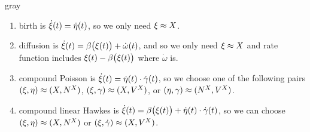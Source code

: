 \begin{color}{gray}
\begin{enumerate}
      \begin{enumerate}
        \item
          birth is  $\dot{\xi}(t) = \dot\eta(t)$, so we only need $\xi \approx X$.
        \item
          diffusion is $\dot{\xi}(t) = \beta\big(\xi(t)\big) + \dot\omega(t)$, and so we only need $\xi\approx X$ and rate function includes $\xi(t) - \beta\big(\xi(t)\big)$ where $\dot\omega$ is.
        \item
          compound Poisson is $\dot{\xi}(t) = \dot\eta(t) \cdot \dot\gamma(t)$, so we choose one of the following pairs $(\xi, \eta) \approx (X, N^X)$, $(\xi, \gamma) \approx (X, V^X)$, or $(\eta, \gamma) \approx (N^X, V^X)$.
        \item
          compound linear Hawkes is $\dot{\xi}(t) = \beta\big(\xi(t)\big) + \dot\eta(t) \cdot \dot\gamma(t)$, so we can choose $(\xi, \eta) \approx (X, N^X)$ or $(\xi, \dot\gamma) \approx (X, V^X)$.
      \end{enumerate}
  \end{enumerate}
\end{color}
